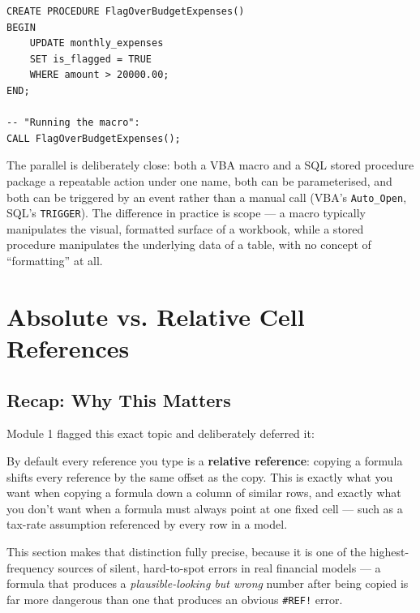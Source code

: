 \documentclass[11pt,a4paper]{article}
\begin{document}
\begin{lstlisting}[style=sqlstyle, caption={A stored procedure -- SQL's version of "a saved, repeatable, named sequence of actions"}]
CREATE PROCEDURE FlagOverBudgetExpenses()
BEGIN
    UPDATE monthly_expenses
    SET is_flagged = TRUE
    WHERE amount > 20000.00;
END;

-- "Running the macro":
CALL FlagOverBudgetExpenses();
\end{lstlisting}

\begin{keyconcept}
The parallel is deliberately close: both a VBA macro and a SQL stored procedure package a repeatable action under one name, both can be parameterised, and both can be triggered by an event rather than a manual call (VBA's \texttt{Auto\_Open}, SQL's \texttt{TRIGGER}). The difference in practice is scope --- a macro typically manipulates the visual, formatted surface of a workbook, while a stored procedure manipulates the underlying data of a table, with no concept of ``formatting'' at all.
\end{keyconcept}

\section{Absolute vs. Relative Cell References}
\label{sec:absrel}

\subsection{Recap: Why This Matters}

Module 1 flagged this exact topic and deliberately deferred it:

\begin{keyconcept}
By default every reference you type is a \textbf{relative reference}: copying a formula shifts every reference by the same offset as the copy. This is exactly what you want when copying a formula down a column of similar rows, and exactly what you don't want when a formula must always point at one fixed cell --- such as a tax-rate assumption referenced by every row in a model.
\end{keyconcept}

This section makes that distinction fully precise, because it is one of the highest-frequency sources of silent, hard-to-spot errors in real financial models --- a formula that produces a \emph{plausible-looking but wrong} number after being copied is far more dangerous than one that produces an obvious \texttt{\#REF!} error.
\end{document}
